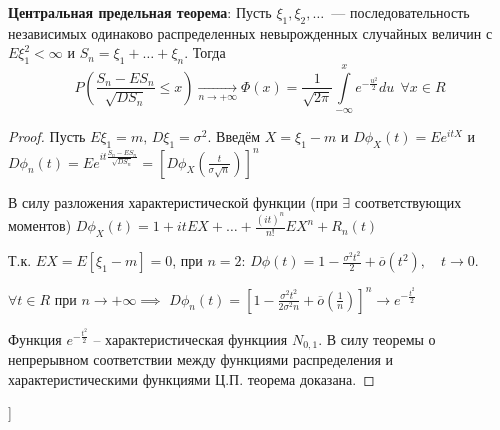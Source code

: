 \textbf{Центральная предельная теорема}:
    Пусть $\xi_{1}, \xi_{2}, \ldots$~--- последовательность независимых одинаково распределенных невырожденных случайных величин с $E \xi_{1}^{2}<\infty$ и $S_{n}=\xi_{1}+\ldots+\xi_{n}$. 
    Тогда
    \begin{equation*}
        P\left(\frac{S_{n}-E S_{n}}{\sqrt{D S_{n}}} \leqslant x\right)
        \xrightarrow[n \to +\infty]{}
        \Phi(x) = \frac{1}{\sqrt{2 \pi}} \int\limits_{-\infty}^{x} e^{-\frac{u^{2}}{2}} du~~ \forall x \in R
    \end{equation*}

\begin{proof}
Пусть $E \xi_{1}=m,\, D \xi_{1}=\sigma^{2}$. 
Введём $X = \xi_1 - m$ и $D \phi_X(t)=E e^{i tX}$ и 
$
    D \phi_{n}(t)=E e^{i t \frac{S_{n}-E S_{n}}{\sqrt{D S_{n}}}} = 
    \left[D \phi_X\left(\frac{t}{\sigma \sqrt{n}}\right)\right]^{n}
$

В силу разложения характеристической функции (при $\exists$ соответствующих моментов)
$
    D \phi_{X}(t)=1+i t E X+\ldots+\frac{(i t)^{n}}{n !} E X^{n}+R_{n}(t)
$

Т.к. $E X = E \left[ \xi_1 - m\right] = 0$, при $n=2$: 
$
    D \phi(t)=1-\frac{\sigma^{2} t^{2}}{2}+\overline{o}\left(t^{2}\right), \quad t \to 0
$.

$\forall t \in R$ при $n \to +\infty \implies $
$
    D \phi_{n}(t)=\left[1-\frac{\sigma^{2} t^{2}}{2 \sigma^{2} n}+\overline{o}\left(\frac{1}{n}\right)\right]^n \to e^{-\frac{t^{2}}{2}}
$

Функция $e^{-\frac{t^{2}}{2}}$ -- характеристическая функциия $N_{0,1}$. 
В силу теоремы о непрерывном соответствии между функциями распределения и характеристическими функциями Ц.П. теорема доказана.
\end{proof}

\bigbreak
[\cite[page 1-53]{stat_book}]